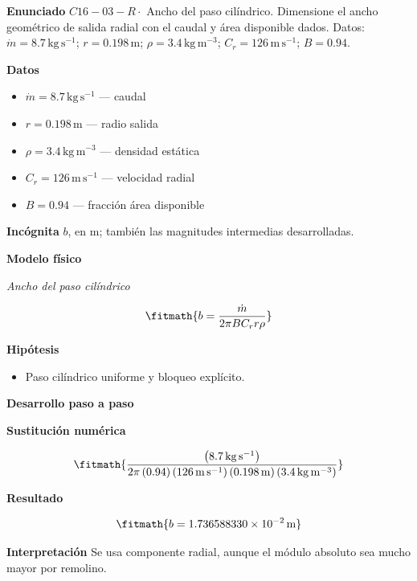 \documentclass[10pt,openany]{book}
\begin{document}
\begin{tcolorbox}[title={Problema resuelto 3}, studiumworked, breakable]

\noindent\textbf{Enunciado}
\(C16-03-R \cdot\) Ancho del paso cilíndrico. Dimensione el ancho geométrico de salida radial con el caudal y área disponible dados. Datos: \(\dot m=8.7\, \mathrm{kg}\,\mathrm{s}^{-1}\); \(r=0.198\, \mathrm{m}\); \(\rho=3.4\, \mathrm{kg}\,\mathrm{m}^{-3}\); \(C_r=126\, \mathrm{m}\,\mathrm{s}^{-1}\); \(B=0.94\).

\noindent\textbf{Datos}
\begin{itemize}
\item $\dot m = 8.7\,\mathrm{kg}\,\mathrm{s}^{-1}$ — caudal
\item $r = 0.198\,\mathrm{m}$ — radio salida
\item $\rho = 3.4\,\mathrm{kg}\,\mathrm{m}^{-3}$ — densidad estática
\item $C_r = 126\,\mathrm{m}\,\mathrm{s}^{-1}$ — velocidad radial
\item $B = 0.94$ — fracción área disponible
\end{itemize}

\noindent\textbf{Incógnita}
$b$, en $\mathrm{m}$; también las magnitudes intermedias desarrolladas.

\noindent\textbf{Modelo físico}

\noindent\textit{Ancho del paso cilíndrico}

\[
\fitmath{b=\frac{\dot m}{2 \pi B C_r r \rho}}
\]

\noindent\textbf{Hipótesis}
\begin{itemize}
\item Paso cilíndrico uniforme y bloqueo explícito.
\end{itemize}

\noindent\textbf{Desarrollo paso a paso}



\noindent\textbf{Sustitución numérica}

\[
\fitmath{\frac{\left(8.7\,\mathrm{kg}\,\mathrm{s}^{-1}\right)}{2 \pi \left(0.94\right) \left(126\,\mathrm{m}\,\mathrm{s}^{-1}\right) \left(0.198\,\mathrm{m}\right) \left(3.4\,\mathrm{kg}\,\mathrm{m}^{-3}\right)}}
\]

\noindent\textbf{Resultado}

\[
\fitmath{b=1.736588330\times10^{-2}\,\mathrm{m}}
\]

\noindent\textbf{Interpretación}
Se usa componente radial, aunque el módulo absoluto sea mucho mayor por remolino.


\end{tcolorbox}
\end{document}
